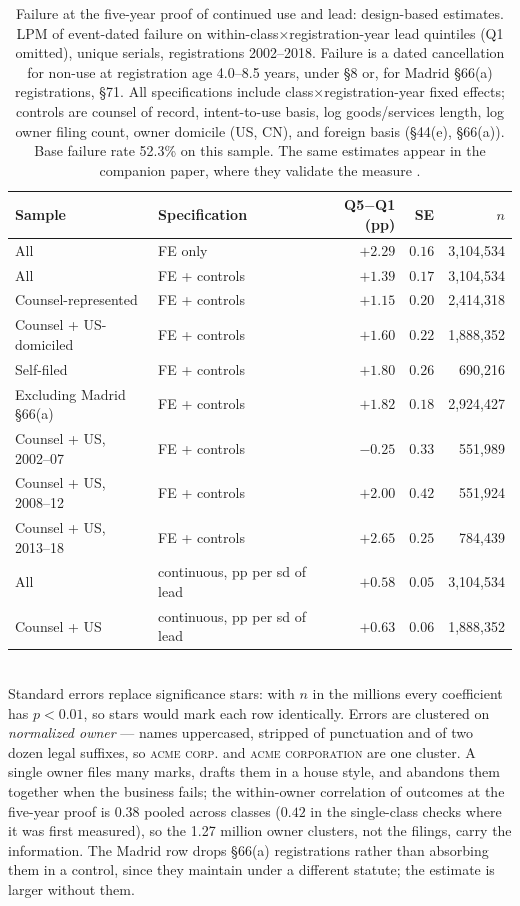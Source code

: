 \begin{table}[!htbp]\centering\small
\caption{Failure at the five-year proof of continued use and lead:
design-based estimates. LPM of event-dated failure on
within-class$\times$registration-year lead quintiles (Q1 omitted), unique
serials, registrations 2002--2018. Failure is a dated cancellation for
non-use at registration age 4.0--8.5 years, under \S8 or, for Madrid
\S66(a) registrations, \S71. All specifications include
class$\times$registration-year fixed effects; controls are counsel of
record, intent-to-use basis, log goods/services length, log owner filing
count, owner domicile (US, CN), and foreign basis (\S44(e), \S66(a)).
Base failure rate 52.3\% on this sample. The same estimates appear in
the companion paper, where they validate the measure
\citep{SilverCorpus2026}.}
\label{tab:gate_lpm}
\begin{tabular}{llrrr}
\toprule
Sample & Specification & Q5$-$Q1 (pp) & SE & $n$ \\
\midrule
All & FE only & $+2.29$ & $0.16$ & 3{,}104{,}534 \\
All & FE + controls & $+1.39$ & $0.17$ & 3{,}104{,}534 \\
Counsel-represented & FE + controls & $+1.15$ & $0.20$ & 2{,}414{,}318 \\
Counsel + US-domiciled & FE + controls & $+1.60$ & $0.22$ & 1{,}888{,}352 \\
Self-filed & FE + controls & $+1.80$ & $0.26$ & 690{,}216 \\
Excluding Madrid \S66(a) & FE + controls & $+1.82$ & $0.18$ & 2{,}924{,}427 \\
\midrule
Counsel + US, 2002--07 & FE + controls & $-0.25$ & $0.33$ & 551{,}989 \\
Counsel + US, 2008--12 & FE + controls & $+2.00$ & $0.42$ & 551{,}924 \\
Counsel + US, 2013--18 & FE + controls & $+2.65$ & $0.25$ & 784{,}439 \\
\midrule
All & continuous, pp per sd of lead & $+0.58$ & $0.05$ & 3{,}104{,}534 \\
Counsel + US & continuous, pp per sd of lead & $+0.63$ & $0.06$ & 1{,}888{,}352 \\
\bottomrule
\end{tabular}
\\[0.3em]\footnotesize Standard errors replace significance stars: with
$n$ in the millions every coefficient has $p < 0.01$, so stars would mark
each row identically. Errors are clustered on \emph{normalized owner} ---
names uppercased, stripped of punctuation and of two dozen legal suffixes,
so \textsc{acme corp.} and \textsc{acme corporation} are one cluster. A
single owner files many marks, drafts them in a house style, and abandons
them together when the business fails; the within-owner correlation of
outcomes at the five-year proof is $0.38$ pooled across classes ($0.42$ in
the single-class checks where it was first measured), so the 1.27 million
owner clusters, not the filings, carry the information. The Madrid row
drops \S66(a) registrations rather than absorbing them in a control, since
they maintain under a different statute; the estimate is larger without
them.
\end{table}

